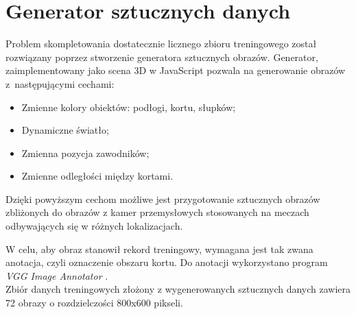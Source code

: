 \newpage
\section{Generator sztucznych danych}
\label{sec:generator}

Problem skompletowania dostatecznie licznego zbioru treningowego został rozwiązany poprzez stworzenie generatora sztucznych obrazów.
Generator, zaimplementowany jako scena 3D w JavaScript pozwala na generowanie obrazów z~następującymi cechami:

\begin{itemize}
	\item Zmienne kolory obiektów: podłogi, kortu, słupków;
	\item Dynamiczne światło;
	\item Zmienna pozycja zawodników;
	\item Zmienne odległości między kortami.
\end{itemize}

Dzięki powyższym cechom możliwe jest przygotowanie sztucznych obrazów zbliżonych do obrazów z kamer przemysłowych stosowanych na meczach odbywających się w różnych lokalizacjach.

W celu, aby obraz stanowił rekord treningowy, wymagana jest tak zwana anotacja, czyli oznaczenie obszaru kortu. Do anotacji wykorzystano program \textit{VGG Image Annotator} \cite{dutta2016via} \cite{dutta2019vgg}.
\\
Zbiór danych treningowych złożony z wygenerowanych sztucznych danych zawiera 72 obrazy o rozdzielczości 800x600 pikseli.

